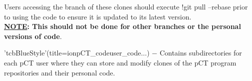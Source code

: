 \begin{tcbfunctionenv}
\begin{tcbparagraph}
Users accessing the  branch of these clones should execute \tcbinlinebashbox!{git pull --rebase} prior to using the code to ensure it is updated to its latest version.\\[\tcbparskip]

\textbf{\ul{NOTE}: This should not be done for other branches or the personal versions of code}.
\end{tcbparagraph}
\begin{tcbparagraph}'tcbBlueStyle'(title=\dirsep ion\dirsep pCT\_code\dirsep user\_code\dirsep\usernamelabel\dirsep$\dots$)
$\boldsymbol{-}$ Contains subdirectories for each pCT user where they can store and modify clones of the pCT program repositories and their personal code.
\end{tcbparagraph}
\end{tcbfunctionenv}
\endinput